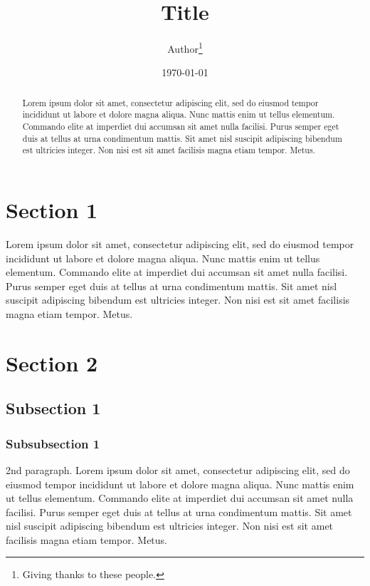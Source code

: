 \documentclass[12pt, a4paper]{article}
\title{Title}
\author{Author\thanks{Giving thanks to these people.}}
\date{\today}
\begin{document}
    \maketitle
    \begin{abstract}
        Lorem ipsum dolor sit amet, consectetur adipiscing elit, sed do eiusmod tempor incididunt ut labore et dolore magna aliqua. Nunc mattis enim ut tellus elementum. Commando elite at imperdiet dui accumsan sit amet nulla facilisi. Purus semper eget duis at tellus at urna condimentum mattis. Sit amet nisl suscipit adipiscing bibendum est ultricies integer. Non nisi est sit amet facilisis magna etiam tempor. Metus.
    \end{abstract}

    \tableofcontents

    \section{Section 1}
    
    Lorem ipsum dolor sit amet, consectetur adipiscing elit, sed do eiusmod tempor incididunt ut labore et dolore magna aliqua. Nunc mattis enim ut tellus elementum. Commando elite at imperdiet dui accumsan sit amet nulla facilisi. Purus semper eget duis at tellus at urna condimentum mattis. Sit amet nisl suscipit adipiscing bibendum est ultricies integer. Non nisi est sit amet facilisis magna etiam tempor. Metus. \newline

    \section{Section 2}


    \subsection{Subsection 1} %

    \subsubsection{Subsubsection 1}

    2nd paragraph. Lorem ipsum dolor sit amet, consectetur adipiscing elit, sed do eiusmod tempor incididunt ut labore et dolore magna aliqua. Nunc mattis enim ut tellus elementum. Commando elite at imperdiet dui accumsan sit amet nulla facilisi. Purus semper eget duis at tellus at urna condimentum mattis. Sit amet nisl suscipit adipiscing bibendum est ultricies integer. Non nisi est sit amet facilisis magna etiam tempor. Metus.
\end{document}
